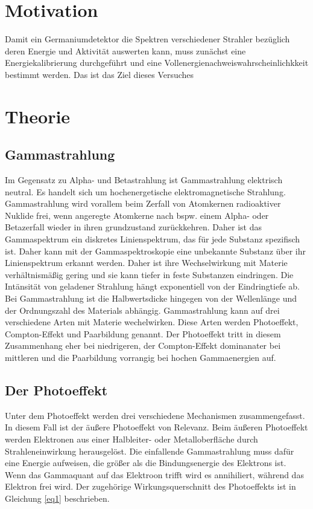 \section{Motivation}
Damit ein Germaniumdetektor die Spektren verschiedener Strahler bezüglich deren
Energie und Aktivität auswerten kann, muss zunächst eine Energiekalibrierung 
durchgeführt und
eine Vollenergienachweiswahrscheinlichkkeit bestimmt werden. 
Das ist das Ziel dieses Versuches

\section{Theorie}
\label{sec:Theorie}

\subsection{Gammastrahlung}
Im Gegensatz zu Alpha- und Betastrahlung ist Gammastrahlung elektrisch neutral. 
Es handelt sich um hochenergetische elektromagnetische Strahlung.
Gammastrahlung wird vorallem beim Zerfall von Atomkernen radioaktiver Nuklide frei, 
wenn angeregte Atomkerne nach bspw. einem Alpha- oder Betazerfall wieder in ihren 
grundzustand zurückkehren.
Daher ist das Gammaspektrum ein diskretes Linienspektrum, das für jede Substanz 
spezifisch ist. Daher kann mit der Gammaspektroskopie eine unbekannte Substanz über 
ihr Linienspektrum erkannt werden.
Daher ist ihre Wechselwirkung mit Materie verhältnismäßig gering und sie 
kann tiefer in feste Substanzen eindringen.
Die Intänsität von geladener Strahlung hängt exponentiell von der 
Eindringtiefe ab. Bei Gammastrahlung ist die Halbwertsdicke hingegen 
von der Wellenlänge und der Ordnungszahl des Materials abhängig.
Gammastrahlung kann auf drei verschiedene Arten mit Materie wechelwirken.
Diese Arten werden Photoeffekt, Compton-Effekt und Paarbildung genannt.
Der Photoeffekt tritt in diesem Zusammenhang eher bei niedrigeren, der 
Compton-Effekt dominanater bei mittleren und die Paarbildung vorrangig
bei hochen Gammaenergien auf.

\subsection{Der Photoeffekt}
Unter dem Photoeffekt werden drei verschiedene Mechanismen zusammengefasst.
In diesem Fall ist der äußere Photoeffekt von Relevanz.
Beim äußeren Photoeffekt werden Elektronen aus einer Halbleiter- oder Metalloberfläche 
durch Strahleneinwirkung herausgelöst. 
Die einfallende Gammastrahlung muss dafür eine Energie aufweisen, die größer als die 
Bindungsenergie des Elektrons ist. Wenn das Gammaquant auf das Elektroon trifft wird es 
annihiliert, während das Elektron frei wird. Der zugehörige 
Wirkungsquerschnitt des Photoeffekts ist in Gleichung \ref{eq1} beschrieben.


